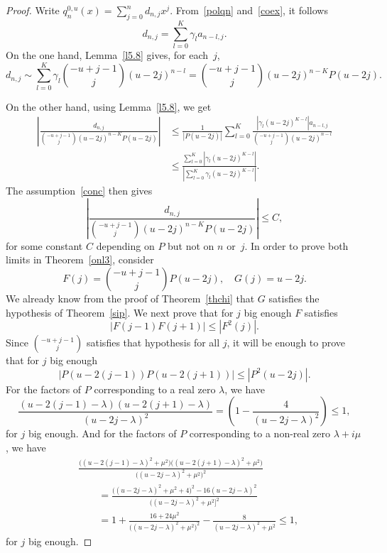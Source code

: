 \documentclass[10pt, a4paper, leqno]{amsart}
\numberwithin{equation}{section}
\theoremstyle{plain}
\theoremstyle{remark}
\begin{document}
\begin{proof}
Write $q_n^{0,u}(x) = \sum_{j=0}^nd_{n,j}x^j$. From~\eqref{polqn} and~\eqref{coex}, it follows
\[
  d_{n,j} = \sum_{l=0}^K\gamma_la_{n-l,j}.
\]
On the one hand, Lemma~\ref{l5.8} gives, for each~$j$,
\begin{equation}
\label{cotxa}
  d_{n,j} \sim \sum_{l=0}^K \gamma_l \binom{-u+j-1}{j} (u-2j)^{n-l}
  = \binom{-u+j-1}{j} (u-2j)^{n-K}P(u-2j).
\end{equation}

On the other hand, using Lemma~\ref{l5.8}, we get
\begin{align*}
  \left|\frac{d_{n,j}}{\binom{-u+j-1}{j}(u-2j)^{n-K}P(u-2j)}\right|
  & \le \frac{1}{|P(u-2j)|}
  \sum_{l=0}^K \frac{|\gamma_l(u-2j)^{K-l}|a_{n-l,j}}{\binom{-u+j-1}{j}(u-2j)^{n-l}} \\
  & \le \frac{\sum_{l=0}^K|\gamma_l(u-2j)^{K-l}|}{|\sum_{l=0}^K\gamma_l(u-2j)^{K-l}|}.
\end{align*}
The assumption~\eqref{conc} then gives
\begin{equation}
\label{cotxb}
  \left|\frac{d_{n,j}}{\binom{-u+j-1}{j}(u-2j)^{n-K} P(u-2j)}\right| \le C,
\end{equation}
for some constant $C$ depending on $P$ but not on $n$ or~$j$.
In order to prove both limits in Theorem~\ref{onl3}, consider
\[
  F(j) = \binom{-u+j-1}{j}P(u-2j),\quad G(j)=u-2j.
\]
We already know from the proof of Theorem~\ref{thchi} that $G$ satisfies the hypothesis of Theorem~\ref{sip}.
We next prove that for $j$ big enough $F$ satisfies
\[
  |F(j-1)F(j+1)| \le |F^2(j)|.
\]
Since $\binom{-u+j-1}{j}$ satisfies that hypothesis for all $j$, it will be enough to prove that for $j$ big enough
\[
  |P(u-2(j-1))P(u-2(j+1))| \le |P^2(u-2j)|.
\]
For the factors of $P$ corresponding to a real zero $\lambda$, we have
\[
  \frac{(u-2(j-1)-\lambda)(u-2(j+1)-\lambda)}{(u-2j-\lambda)^2}
  = \left(1-\frac{4}{(u-2j-\lambda)^2}\right) \le 1,
\]
for $j$ big enough. And for the factors of $P$ corresponding to a non-real zero $\lambda+i\mu$, we have
\begin{align*}
  & \frac{\bigl((u-2(j-1)-\lambda)^2+\mu^2\bigr) \bigl((u-2(j+1)-\lambda)^2+\mu^2\bigr)}
    {\bigl((u-2j-\lambda)^2+\mu^2\bigr)^2} \\
  & \qquad = \frac{\bigl((u-2j-\lambda)^2+\mu^2+4\bigr)^2 - 16(u-2j-\lambda)^2}{\bigl((u-2j-\lambda)^2+\mu^2]^2} \\
  & \qquad = 1+\frac{16+24\mu^2}{\bigl((u-2j-\lambda)^2+\mu^2\bigr)^2} - \frac{8}{(u-2j-\lambda)^2+\mu^2} 
  \le 1,
\end{align*}
for $j$ big enough.


\end{proof}
\end{document}
